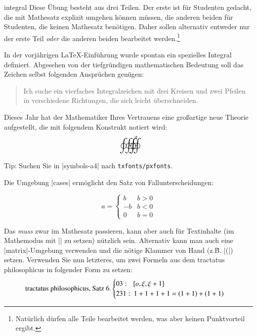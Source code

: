 \documentclass[
	draft,
	blatt=4,
	ausgabe=07.\,05.\,2010,
	rückgabe=14.\,05.\,2010
]{lcourse-hd}
\begin{document}
\begin{exercise}[
  name={Integrale\,/\,Spezialfälle},
  punkte=5,
  abgabe = Quellcode(s) per Mail und ausgedruckt{,} fertige(s) Dokument(e) ausgedruckt]{integral}
Diese Übung besteht aus drei Teilen. Der erste ist für Studenten gedacht, die mit Mathesatz explizit umgehen können müssen, die anderen beiden für Studenten, die keinen Mathesatz benötigen. Daher sollen alternativ entweder nur der erste Teil \emph{oder} die anderen beiden bearbeitet werden.\footnote{Natürlich dürfen alle Teile bearbeitet werden, was aber keinen Punktvorteil ergibt.}

In der vorjährigen \LaTeX-Einführung wurde spontan ein spezielles Integral definiert. Abgesehen von der tiefgründigen mathematischen Bedeutung soll das Zeichen selbst folgenden Ansprüchen genügen:
\begin{quotation}
Ich suche ein vierfaches Integralzeichen mit drei Kreisen und
zwei Pfeilen in verschiedene Richtungen, die sich leicht
überschneiden.
\end{quotation}
Dieses Jahr hat der Mathematiker Ihres Vertrauens eine großartige neue Theorie aufgestellt, die mit folgendem Konstrukt notiert wird:
\[\oint\kern.13em\vec\varoiintctrclockwise\kern-2.48em\varoiintclockwise\]

Tip: Suchen Sie in |symbols-a4| nach \verb|txfonts/pxfonts|.

Die Umgebung |cases| ermöglicht den Satz von Fallunterscheidungen:
\begin{lcode}
\[ a =
\begin{cases}
b & b > 0 \\
-b & b < 0\\
0 & b = 0
\end{cases} \]
\end{lcode}
Das \emph{muss} zwar im Mathesatz passieren, kann aber auch für Textinhalte (im Mathemodus mit || zu setzen) nützlich sein. Alternativ kann man auch eine |matrix|-Umgebung verwenden und die nötige Klammer von Hand (z.\.B. |\left(|) setzen. Verwenden Sie nun letzteres, um zwei Formeln aus dem tractatus philosophicus in folgender Form zu setzen:
\[\text{tractatus philosophicus, Satz 6.}
\begin{cases}
03:\hspace*{0.65em} [o,\xi, \xi +1]\\
231:\ 1+1+1+1 = (1+1) + (1+1)
\end{cases}\]


\end{exercise}
\end{document}
